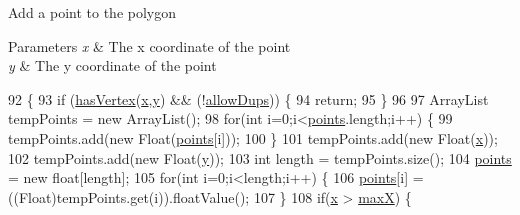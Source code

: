 Add a point to the polygon


\begin{DoxyParams}{Parameters}
{\em x} & The x coordinate of the point \\
\hline
{\em y} & The y coordinate of the point \\
\hline
\end{DoxyParams}

\begin{DoxyCode}
92                                            \{
93         \textcolor{keywordflow}{if} (\mbox{\hyperlink{classorg_1_1newdawn_1_1slick_1_1geom_1_1_shape_a105620e33df143f9ca9b35ecb9c5d324}{hasVertex}}(\mbox{\hyperlink{classorg_1_1newdawn_1_1slick_1_1geom_1_1_shape_a3e985bfff386c15a4efaad03d8ad60d3}{x}},\mbox{\hyperlink{classorg_1_1newdawn_1_1slick_1_1geom_1_1_shape_a9f934baded6a1b65ebb69e7e5f80ea00}{y}}) && (!\mbox{\hyperlink{classorg_1_1newdawn_1_1slick_1_1geom_1_1_polygon_a425e8151c71ea31ba03f5d147f9ef79a}{allowDups}})) \{
94             \textcolor{keywordflow}{return};
95         \}
96         
97         ArrayList tempPoints = \textcolor{keyword}{new} ArrayList();
98         \textcolor{keywordflow}{for}(\textcolor{keywordtype}{int} i=0;i<\mbox{\hyperlink{classorg_1_1newdawn_1_1slick_1_1geom_1_1_shape_a8b4d4058734bbb3b96072e470b92aa37}{points}}.length;i++) \{
99             tempPoints.add(\textcolor{keyword}{new} Float(\mbox{\hyperlink{classorg_1_1newdawn_1_1slick_1_1geom_1_1_shape_a8b4d4058734bbb3b96072e470b92aa37}{points}}[i]));
100         \}
101         tempPoints.add(\textcolor{keyword}{new} Float(\mbox{\hyperlink{classorg_1_1newdawn_1_1slick_1_1geom_1_1_shape_a3e985bfff386c15a4efaad03d8ad60d3}{x}}));
102         tempPoints.add(\textcolor{keyword}{new} Float(\mbox{\hyperlink{classorg_1_1newdawn_1_1slick_1_1geom_1_1_shape_a9f934baded6a1b65ebb69e7e5f80ea00}{y}}));
103         \textcolor{keywordtype}{int} length = tempPoints.size();
104         \mbox{\hyperlink{classorg_1_1newdawn_1_1slick_1_1geom_1_1_shape_a8b4d4058734bbb3b96072e470b92aa37}{points}} = \textcolor{keyword}{new} \textcolor{keywordtype}{float}[length];
105         \textcolor{keywordflow}{for}(\textcolor{keywordtype}{int} i=0;i<length;i++) \{
106             \mbox{\hyperlink{classorg_1_1newdawn_1_1slick_1_1geom_1_1_shape_a8b4d4058734bbb3b96072e470b92aa37}{points}}[i] = ((Float)tempPoints.get(i)).floatValue();
107         \}
108         \textcolor{keywordflow}{if}(\mbox{\hyperlink{classorg_1_1newdawn_1_1slick_1_1geom_1_1_shape_a3e985bfff386c15a4efaad03d8ad60d3}{x}} > \mbox{\hyperlink{classorg_1_1newdawn_1_1slick_1_1geom_1_1_shape_a8c820b5a7df465beab7f021cdd09b826}{maxX}}) \{

\end{DoxyCode}
